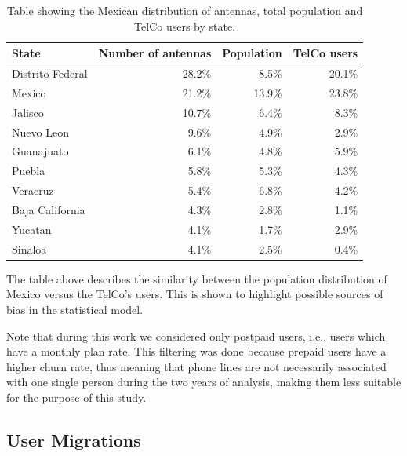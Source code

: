 \begin{table}[ht]
	\caption{Table showing the Mexican distribution of antennas, total population and TelCo users by state.}\label{tab:distribution_by_state}
	\centering
	\begin{tabular}{l r r r}
		\toprule
		State				& Number of antennas & Population 	& TelCo users \\
		\midrule
		Distrito Federal      & 28.2\% 	& 8.5\%		& 20.1\%   \\
		Mexico                     & 21.2\%		&   13.9\% 	& 23.8\%   \\
		Jalisco                   & 10.7\% 	& 6.4\%		& 8.3\%    \\
		Nuevo Leon               & 9.6\%	& 4.9\%		& 2.9\% \\
		Guanajuato               & 6.1\%	& 4.8\%		& 5.9\% \\
		Puebla                     & 5.8\%	& 5.3\%		& 4.3\% \\
		Veracruz                  & 5.4\% 	& 6.8\%		& 4.2\% \\
		Baja California       & 4.3\%	& 2.8\%		& 1.1\% \\
		Yucatan                   & 4.1\%	& 1.7\%		& 2.9\% \\
		Sinaloa                   & 4.1\%	& 2.5\%		& 0.4\% \\
		\bottomrule
	\end{tabular}
\end{table}

The table above describes the similarity between the population distribution of Mexico versus the TelCo's users.
This is shown to highlight possible sources of bias in the statistical model.

Note that during this work we considered only postpaid users, i.e., users which have a monthly plan rate.
This filtering was done because prepaid users have a higher churn rate, thus meaning that phone lines are not necessarily associated with one single person during the two years of analysis, making them less suitable for the purpose of this study.




\subsection{User Migrations}\label{subsection:user_migrations} %

